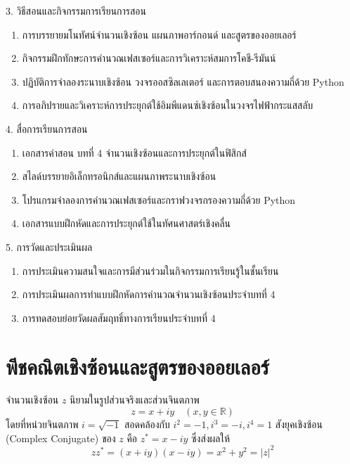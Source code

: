 \newpage

\begin{planbox}[colframe=rbruNavy!85!black, colbacktitle=rbruNavy!85!black]{3. วิธีสอนและกิจกรรมการเรียนการสอน}
\begin{enumerate}[topsep=2pt, itemsep=1pt, partopsep=0pt, parsep=0pt, leftmargin=1.5em]
    \item การบรรยายมโนทัศน์จำนวนเชิงซ้อน แผนภาพอาร์กอนด์ และสูตรของออยเลอร์
    \item กิจกรรมฝึกทักษะการคำนวณเฟสเซอร์และการวิเคราะห์สมการโคชี-รีมันน์
    \item ปฏิบัติการจำลองระนาบเชิงซ้อน วงจรออสซิลเลเตอร์ และการตอบสนองความถี่ด้วย Python
    \item การอภิปรายและวิเคราะห์การประยุกต์ใช้อิมพีแดนซ์เชิงซ้อนในวงจรไฟฟ้ากระแสสลับ
\end{enumerate}
\end{planbox}

\begin{planbox}[colframe=rbruGold!90!black, colbacktitle=rbruGold!90!black]{4. สื่อการเรียนการสอน}
\begin{enumerate}[topsep=2pt, itemsep=1pt, partopsep=0pt, parsep=0pt, leftmargin=1.5em]
    \item เอกสารคำสอน บทที่ 4 จำนวนเชิงซ้อนและการประยุกต์ในฟิสิกส์
    \item สไลด์บรรยายอิเล็กทรอนิกส์และแผนภาพระนาบเชิงซ้อน
    \item โปรแกรมจำลองการคำนวณเฟสเซอร์และกราฟวงจรกรองความถี่ด้วย Python
    \item เอกสารแบบฝึกหัดและการประยุกต์ใช้ในทัศนศาสตร์เชิงคลื่น
\end{enumerate}
\end{planbox}

\begin{planbox}[colframe=rbruSlate, colbacktitle=rbruSlate]{5. การวัดและประเมินผล}
\begin{enumerate}[topsep=2pt, itemsep=1pt, partopsep=0pt, parsep=0pt, leftmargin=1.5em]
    \item การประเมินความสนใจและการมีส่วนร่วมในกิจกรรมการเรียนรู้ในชั้นเรียน
    \item การประเมินผลการทำแบบฝึกหัดการคำนวณจำนวนเชิงซ้อนประจำบทที่ 4
    \item การทดสอบย่อยวัดผลสัมฤทธิ์ทางการเรียนประจำบทที่ 4
\end{enumerate}
\end{planbox}
\clearpage

\section{พีชคณิตเชิงซ้อนและสูตรของออยเลอร์}
จำนวนเชิงซ้อน $z$ นิยามในรูปส่วนจริงและส่วนจินตภาพ
\begin{equation}
z = x + iy \quad (x, y \in \mathbb{R})
\end{equation}
โดยที่หน่วยจินตภาพ $i = \sqrt{-1}$ สอดคล้องกับ $i^2 = -1, i^3 = -i, i^4 = 1$
สังยุคเชิงซ้อน (Complex Conjugate) ของ $z$ คือ $z^* = x - iy$ ซึ่งส่งผลให้
\begin{equation}
z z^* = (x + iy)(x - iy) = x^2 + y^2 = |z|^2
\end{equation}

